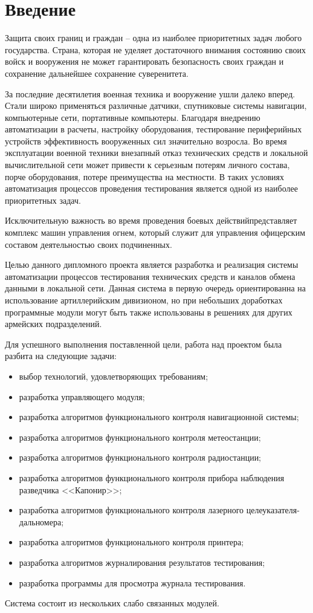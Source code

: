 \part*{Введение}

Защита своих границ и граждан -- одна из наиболее приоритетных задач любого государства.
Страна, которая не уделяет достаточного внимания состоянию своих войск и вооружения не может гарантировать безопасность своих граждан и сохранение дальнейшее сохранение суверенитета.

За последние десятилетия военная техника и вооружение ушли далеко вперед.
Стали широко применяться различные датчики, спутниковые системы навигации, компьютерные сети, портативные компьютеры.
Благодаря внедрению автоматизации в расчеты, настройку оборудования, тестирование периферийных устройств эффективность вооруженных сил значительно возросла.
Во время эксплуатации военной техники внезапный отказ технических средств и локальной вычислительной сети может привести
к серьезным потерям личного состава, порче оборудования, потере преимущества на местности.
В таких условиях автоматизация процессов проведения тестирования является одной из наиболее приоритетных задач.

Исключительную важность во время проведения боевых действий\break представляет комплекс машин управления огнем, который служит для управления офицерским составом деятельностью своих подчиненных.

Целью данного дипломного проекта является разработка и реализация системы автоматизации процессов тестирования технических средств и каналов обмена данными в локальной сети.
Данная система в первую очередь ориентированна на использование артиллерийским дивизионом, но при небольших доработках программные модули могут быть также использованы в решениях для других армейских подразделений.

Для успешного выполнения поставленной цели, работа над проектом была разбита на следующие задачи:
\begin{itemize}
    \item выбор технологий, удовлетворяющих требованиям;
    \item разработка управляющего модуля;
    \item разработка алгоритмов функционального контроля навигационной системы;
    \item разработка алгоритмов функционального контроля метеостанции;
    \item разработка алгоритмов функционального контроля радиостанции;
    \item разработка алгоритмов функционального контроля прибора наблюдения разведчика <<Капонир>>;
    \item разработка алгоритмов функционального контроля лазерного \break целеуказателя-дальномера;
    \item разработка алгоритмов функционального контроля принтера;
    \item разработка алгоритмов журналирования результатов тестирования;
    \item разработка программы для просмотра журнала тестирования.
\end{itemize}

Система состоит из нескольких слабо связанных модулей.
